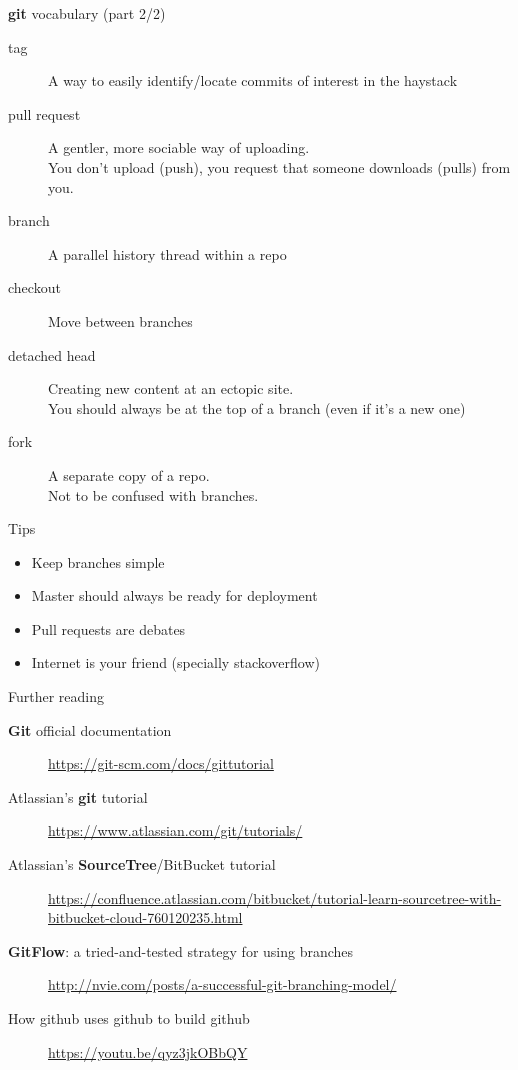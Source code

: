\documentclass[11pt]{beamer}
\begin{document}
\begin{frame}{\textbf{git} vocabulary (part 2/2)}
\begin{description}
\item[tag]{A way to easily identify/locate commits of interest in the haystack} \pause
\item[pull request]{A gentler, more sociable way of uploading. \\ You don't upload (push), you request that someone downloads (pulls) from you.} \pause
\item[branch]{A parallel history thread within a repo} \pause
\item[checkout]{Move between branches} \pause
\item[detached head]{Creating new content at an ectopic site. \\ You should always be at the top of a branch (even if it's a new one)}
\item[fork]{A separate copy of a repo. \\ Not to be confused with branches.} \pause
\end{description}
\end{frame}

\begin{frame}{Tips}
\begin{itemize}
\item Keep branches simple
\item Master should always be ready for deployment
\item Pull requests are debates
\item Internet is your friend (specially stackoverflow)
\end{itemize}

\end{frame}

\begin{frame}{Further reading}
\begin{description}
\item[\textbf{Git} official documentation]{\url{https://git-scm.com/docs/gittutorial}}
\item[Atlassian's \textbf{git} tutorial]{\url{https://www.atlassian.com/git/tutorials/}}
\item[Atlassian's \textbf{SourceTree}/BitBucket tutorial]{\url{https://confluence.atlassian.com/bitbucket/tutorial-learn-sourcetree-with-bitbucket-cloud-760120235.html}}
\item[\textbf{GitFlow}: a tried-and-tested strategy for using branches]{\url{http://nvie.com/posts/a-successful-git-branching-model/}}
\item[How github uses github to build github]{\url{https://youtu.be/qyz3jkOBbQY}}
\end{description}
\end{frame}
\end{document}
